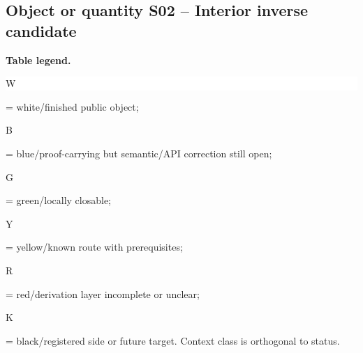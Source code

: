 \subsection*{Object or quantity S02 -- Interior inverse candidate}
\hypertarget{objproof:S02}{}
\par\smallskip\noindent\begin{minipage}{0.99\linewidth}\footnotesize\raggedright\textbf{Table legend.} \colorbox{white}{\strut W} = white/finished public object; \colorbox{cyan!20}{\strut B} = blue/proof-carrying but semantic/API correction still open; \colorbox{green!18}{\strut G} = green/locally closable; \colorbox{yellow!25}{\strut Y} = yellow/known route with prerequisites; \colorbox{red!20}{\strut R} = red/derivation layer incomplete or unclear; \colorbox{black!18}{\strut K} = black/registered side or future target. Context class is orthogonal to status.\end{minipage}\par\vspace{0.25em}
